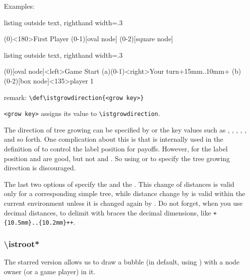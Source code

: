 Examples:

\begin{tcblisting}{listing outside text, righthand width=.3\linewidth}
\begin{istgame}
\istroot[right](0)<180>{First Player}
  \istb  \istb  \endist
\xtNode(0-1)[oval node] \xtNode(0-2)[square node]
\end{istgame}
\end{tcblisting}


\begin{tcblisting}{listing outside text, righthand width=.3\linewidth}
\begin{istgame}
\xtdistance{20mm}{20mm}
\istroot[right](0)[oval node]<left>{Game Start}
  \istb  \istb  \endist
\istroot(a)(0-1)<right>{Your turn}+15mm..10mm+
  \istb  \istb  \endist
\istroot[right](b)(0-2)[box node]<135>{player 1}
  \istb  \istb  \endist
\end{istgame}
\end{tcblisting}


remark: \verb|\def\istgrowdirection{<grow key>}|\par
\quad\verb|<grow key>| assigns its value to \verb|\istgrowdirection|.

The direction of tree growing can be specified by  or the key values such as 
, , , , , and so forth.
One complication about this is that \cmd{\istgrowdirection} is internally used 
in the definition of \cmd{\istb} to control the label position for payoffs.
However, for the label position  and  are good, 
but not  and .
So using  or  to specify the tree growing direction is discouraged.

The last two options of \cmd{\istroot} specify the  and the .
This change of distances is valid only for a corresponding simple tree, while distance change by \cmd{\xtdistance} is valid within the current  environment unless it is changed again by \cmd{\xtdistance}.
Do not forget, when you use decimal distances, to delimit with braces the decimal dimensions, like
\verb|+{10.5mm}..{10.2mm}++|.


\subsubsection*{\textbackslash istroot*}

The starred version \cmd{\istroot*} allows us to draw a bubble (in default, using ) with a node owner (or a game player) in it.

